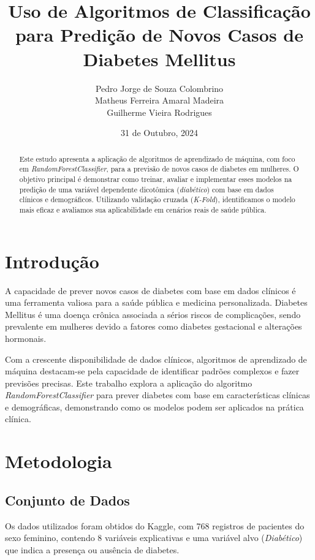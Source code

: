 \documentclass[a4paper,12pt]{article}
\title{Uso de Algoritmos de Classificação para Predição de Novos Casos de Diabetes Mellitus}
\author{Pedro Jorge de Souza Colombrino \\ Matheus Ferreira Amaral Madeira \\ Guilherme Vieira Rodrigues}
\date{31 de Outubro, 2024}
\begin{document}
\maketitle

\begin{abstract}
Este estudo apresenta a aplicação de algoritmos de aprendizado de máquina, com foco em \textit{RandomForestClassifier}, para a previsão de novos casos de diabetes em mulheres. O objetivo principal é demonstrar como treinar, avaliar e implementar esses modelos na predição de uma variável dependente dicotômica (\textit{diabético}) com base em dados clínicos e demográficos. Utilizando validação cruzada (\textit{K-Fold}), identificamos o modelo mais eficaz e avaliamos sua aplicabilidade em cenários reais de saúde pública.
\end{abstract}

\section{Introdução}

A capacidade de prever novos casos de diabetes com base em dados clínicos é uma ferramenta valiosa para a saúde pública e medicina personalizada. Diabetes Mellitus é uma doença crônica associada a sérios riscos de complicações, sendo prevalente em mulheres devido a fatores como diabetes gestacional e alterações hormonais.

Com a crescente disponibilidade de dados clínicos, algoritmos de aprendizado de máquina destacam-se pela capacidade de identificar padrões complexos e fazer previsões precisas. Este trabalho explora a aplicação do algoritmo \textit{RandomForestClassifier} para prever diabetes com base em características clínicas e demográficas, demonstrando como os modelos podem ser aplicados na prática clínica.

\section{Metodologia}

\subsection{Conjunto de Dados}
Os dados utilizados foram obtidos do Kaggle, com 768 registros de pacientes do sexo feminino, contendo 8 variáveis explicativas e uma variável alvo (\textit{Diabético}) que indica a presença ou ausência de diabetes.
\end{document}
